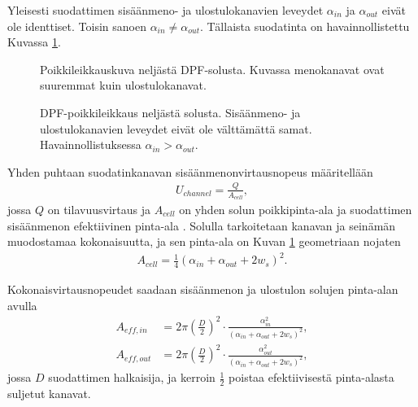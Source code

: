 Yleisesti suodattimen sisäänmeno- ja ulostulokanavien leveydet \(\alpha_{in}\) ja \(\alpha_{out}\) eivät ole identtiset. Toisin sanoen \(\alpha_{in} \neq \alpha_{out}\). Tällaista suodatinta on havainnollistettu Kuvassa \ref{fig:hac_dpf_clean}.
%
\begin{figure}[H]
    \centering 
               {Poikkileikkauskuva neljästä DPF-solusta. Kuvassa menokanavat ovat suuremmat kuin ulostulokanavat.}
    \caption{DPF-poikkileikkaus neljästä solusta. Sisäänmeno- ja ulostulokanavien leveydet eivät ole välttämättä samat. Havainnollistuksessa \(\alpha_{in}>\alpha_{out}\).}
    \label{fig:hac_dpf_clean}
\end{figure}

Yhden puhtaan suodatinkanavan sisäänmenonvirtausnopeus määritellään 
\begin{align}\label{eq:flow_velocity_clean}
    U_{channel} = \frac{Q}{A_{cell}},
\end{align}
jossa \(Q\) on tilavuusvirtaus ja \(A_{cell}\) on  yhden solun poikkipinta-ala ja suodattimen sisäänmenon efektiivinen pinta-ala \cite{Konstandopoulos2000}. Solulla tarkoitetaan kanavan ja seinämän muodostamaa kokonaisuutta, ja sen pinta-ala on Kuvan \ref{fig:hac_dpf_clean}  geometriaan nojaten
\begin{align}
    A_{cell}=\frac{1}{4}(\alpha_{in}+\alpha_{out}+2w_s)^2.
\end{align}

Kokonaisvirtausnopeudet saadaan sisäänmenon ja ulostulon solujen pinta-alan avulla
\begin{align}
    A_{eff, in} &= 2 \pi \left(\frac{D}{2}\right)^2 \cdot \frac{\alpha_{in}^2}{(\alpha_{in}+\alpha_{out}+2w_s)^2}, \label{eq:area_eff_in} \\
    A_{eff, out} &= 2 \pi \left(\frac{D}{2}\right)^2 \cdot \frac{\alpha_{out}^2}{(\alpha_{in}+\alpha_{out}+2w_s)^2},\label{eq:area_eff_out}
\end{align}
jossa \(D \) suodattimen halkaisija, ja kerroin \(\frac{1}{2}\) poistaa efektiivisestä pinta-alasta suljetut kanavat.

